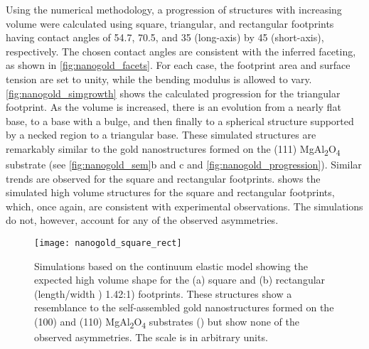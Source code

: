 Using the numerical methodology, a progression of
structures with increasing volume were calculated using
square, triangular, and rectangular footprints having contact
angles of 54.7\degree, 70.5\degree, and 35\degree{} (long-axis) by 45\degree{} (short-axis),
respectively. The chosen contact angles are consistent with
the inferred faceting, as shown in \cref{fig:nanogold_facets}. For each case,
the footprint area and surface tension are set to unity, while
the bending modulus is allowed to vary. \cref{fig:nanogold_simgrowth} shows the
calculated progression for the triangular footprint. As the
volume is increased, there is an evolution from a nearly flat
base, to a base with a bulge, and then finally to a spherical
structure supported by a necked region to a triangular base.
These simulated structures are remarkably similar to the gold
nanostructures formed on the (111) MgAl\textsubscript{2}O\textsubscript{4} substrate (see
\cref{fig:nanogold_sem}b and c and \cref{fig:nanogold_progression}). Similar trends are observed for the
square and rectangular footprints.  shows the
simulated high volume structures for the square and rectangular footprints, which, once again, are consistent with
experimental observations. The simulations do not, however,
account for any of the observed asymmetries.
\begin{figure}
    \centering
    \texttt{[image: nanogold\_square\_rect]}
    \caption[Simulations of square and rectangular base gold nanostructures]{\label{fig:nanogold_square_rect}Simulations based on the continuum elastic model
        showing the expected high volume shape for the (a) square and
        (b) rectangular (length/width ) 1.42:1) footprints. These structures
        show a resemblance to the self-assembled gold nanostructures
        formed on the (100) and (110) MgAl\textsubscript{2}O\textsubscript{4} substrates () but
        show none of the observed asymmetries. The scale is in arbitrary
        units.}
\end{figure}

